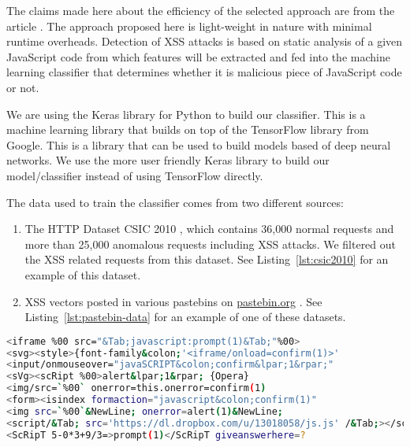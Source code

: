 \documentclass[10pt,journal,compsoc]{IEEEtran}
\begin{document}
The claims made here about the efficiency of the selected approach are from the article \citep*{khan}.
The approach proposed here is light-weight in nature with minimal runtime overheads.
Detection of XSS attacks is based on static analysis of a given JavaScript code from which
features will be extracted and fed into the machine learning classifier that determines whether it is
malicious piece of JavaScript code or not.

We are using the Keras library \citep*{keras} for Python to build our classifier.
This is a machine learning library that builds on top of the TensorFlow library \citep*{tensorflow} from Google.
This is a library that can be used to build models based of deep neural networks.
We use the more user friendly Keras library to build our model/classifier instead of using TensorFlow directly.

The data used to train the classifier comes from two different sources:

\begin{enumerate}
    \item The HTTP Dataset CSIC 2010 \citep*{csic2010}, which contains 36,000 normal requests
    and more than 25,000 anomalous requests including XSS attacks.
    We filtered out the XSS related requests from this dataset.
    See Listing~\ref{lst:csic2010} for an example of this dataset.

    \item XSS vectors posted in various pastebins on \url{pastebin.org} \citep*{pastebin}.
    See Listing~\ref{lst:pastebin-data} for an example of one of these datasets.
\end{enumerate}

\begin{lstlisting}[language=bash, caption={Example of data from pastebin}, label={lst:pastebin-data}]
<iframe %00 src="&Tab;javascript:prompt(1)&Tab;"%00>
<svg><style>{font-family&colon;'<iframe/onload=confirm(1)>'
<input/onmouseover="javaSCRIPT&colon;confirm&lpar;1&rpar;"
<sVg><scRipt %00>alert&lpar;1&rpar; {Opera}
<img/src=`%00` onerror=this.onerror=confirm(1)
<form><isindex formaction="javascript&colon;confirm(1)"
<img src=`%00`&NewLine; onerror=alert(1)&NewLine;
<script/&Tab; src='https://dl.dropbox.com/u/13018058/js.js' /&Tab;></script>
<ScRipT 5-0*3+9/3=>prompt(1)</ScRipT giveanswerhere=?
\end{lstlisting}
\end{document}
